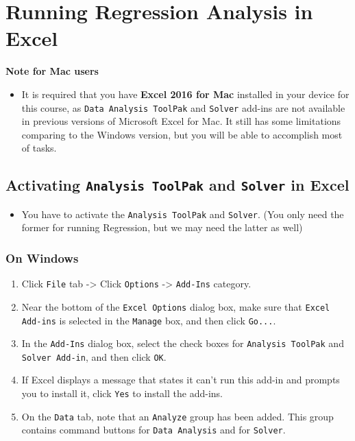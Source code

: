 \documentclass[10pt,article]{article}
\begin{document}
\section{Running Regression Analysis in Excel}
\label{sec:org5fa5e51}
\iffalse
\begin{itemize}
\item Mac Users: please install \textbf{Excel 2016 for Mac}
\end{itemize}
\fi

\begin{mdframed}
\textbf{Note for Mac users}

\begin{itemize}
\item It is required that you have \textbf{Excel 2016 for Mac} installed in your device
for this course, as \texttt{Data Analysis ToolPak} and \texttt{Solver} add-ins are not
available in previous versions of Microsoft Excel for Mac. It still has some
limitations comparing to the Windows version, but you will be able to
accomplish most of tasks.
\end{itemize}
\end{mdframed}

\subsection{Activating \texttt{Analysis ToolPak} and \texttt{Solver} in Excel}
\label{sec:orge7b758a}
\begin{itemize}
\item You have to activate the \texttt{Analysis ToolPak} and \texttt{Solver}. (You only need the former
for running Regression, but we may need the latter as well)
\end{itemize}
\subsubsection{On Windows}
\label{sec:orgb8d21f4}
\begin{enumerate}
\item Click \texttt{File} tab -> Click \texttt{Options} -> \texttt{Add-Ins} category.
\item Near the bottom of the \texttt{Excel Options} dialog box, make sure that \texttt{Excel
   Add-ins} is selected in the \texttt{Manage} box, and then click \texttt{Go...}.
\item In the \texttt{Add-Ins} dialog box, select the check boxes for \texttt{Analysis ToolPak}
and \texttt{Solver Add-in}, and then click \texttt{OK}.
\item If Excel displays a message that states it can't run this add-in and
prompts you to install it, click \texttt{Yes} to install the add-ins.
\item On the \texttt{Data} tab, note that an \texttt{Analyze} group has been added. This group
contains command buttons for \texttt{Data Analysis} and for \texttt{Solver}.
\end{enumerate}
\end{document}
